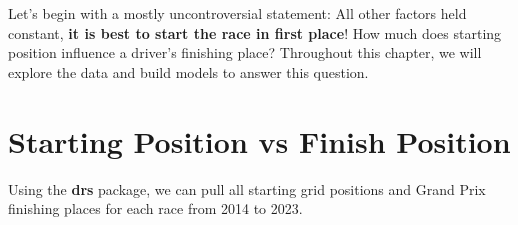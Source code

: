 \documentclass[
]{book}
\begin{document}
Let's begin with a mostly uncontroversial statement: All other factors held constant, \textbf{it is best to start the race in first place}! How much does starting position influence a driver's finishing place? Throughout this chapter, we will explore the data and build models to answer this question.

\newpage

\hypertarget{starting-position-vs-finish-position}{%
\section{Starting Position vs Finish Position}\label{starting-position-vs-finish-position}}

Using the \textbf{drs} package, we can pull all starting grid positions and Grand Prix finishing places for each race from 2014 to 2023.
\end{document}

